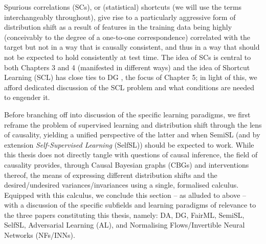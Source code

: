 %
Spurious correlations (SCs), or (statistical) shortcuts (we will use the terms interchangeably
throughout), give rise to a particularly aggressive form of distribution shift as a result of
features in the training data being highly (conceivably to the degree of a one-to-one
correspondence) correlated with the target but not in a way that is causally consistent, and thus
in a way that should not be expected to hold consistently at test time. 
%
The idea of SCs is central to both Chapters 3 and 4 (manifested in different ways) and the idea of
Shortcut Learning (SCL) has close ties to DG \citep{arjovsky2019invariant}, the focus of Chapter 5;
in light of this, we afford dedicated discussion of the SCL problem and what conditions are needed
to engender it.

%
Before branching off into discussion of the specific learning paradigms, we first reframe the
problem of supervised learning and distribution shift through the lens of causality, yielding a
unified perspective of the latter and when SemiSL (and by extension \emph{Self-Supervised
Learning} (SelfSL)) should be expected to work.
%
While this thesis does not directly tangle with questions of causal inference, the field of
causality \citep{pearl2009causality} provides, through Causal Bayesian graphs (CBGs) and
interventions thereof, the means of expressing different distribution shifts and the
desired/undesired variances/invariances using a single, formalised calculus.
%
Equipped with this calculus, we conclude this section -- as alluded to above -- with a discussion
of the specific subfields and learning paradigms of relevance to the three papers constituting this
thesis, namely:  DA, DG, FairML, SemiSL, SelfSL, Adversarial Learning (AL), and Normalising
Flows/Invertible Neural Networks (NFs/INNs).

